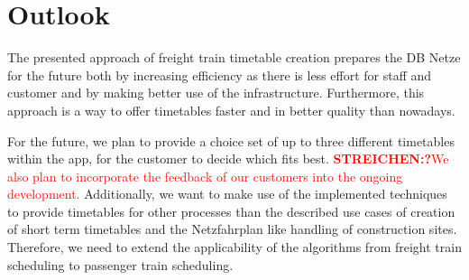 \section{Outlook}
\label{chap:outlook}
The presented approach of freight train timetable creation prepares the DB Netze for the future both by increasing efficiency as there is less effort for staff and customer and by making better use of the infrastructure. Furthermore, this approach is a way to offer timetables faster and in better quality than nowadays.

For the future, we plan to provide a choice set of up to three different timetables within the app, for the customer to decide which fits best. \textcolor{red}{\textbf{STREICHEN:?}We also plan to incorporate the feedback of our customers into the ongoing development.}
Additionally, we want to make use of the implemented techniques to provide timetables for other processes than the described use cases of creation of short term timetables and the Netzfahrplan like handling of construction sites. Therefore, we need to extend the applicability of the algorithms from freight train scheduling to passenger train scheduling.